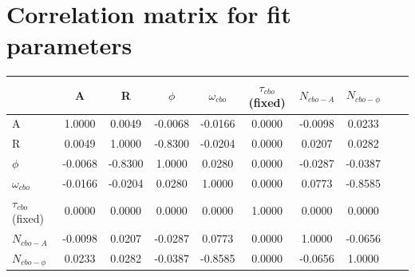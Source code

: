 \section{Correlation matrix for fit parameters}

\begin{table}[H]
\setlength\tabcolsep{0pt}
\begin{tabular*}{\linewidth}{@{\extracolsep{\fill}}
                                l
                           *{9}{c}
                            }
    \toprule
                & A & R & $\phi$ & $\omega_{cbo}$ & $\tau_{cbo}$ (fixed) & $N_{cbo-A}$ & $N_{cbo-\phi}$ \\
    \midrule
	A    			 	 &  1.0000  &  0.0049  & -0.0068  & -0.0166  &  0.0000  & -0.0098  &  0.0233  \\
	R     			 	 &  0.0049  &  1.0000  & -0.8300  & -0.0204  &  0.0000  &  0.0207  &  0.0282  \\
	$\phi$   			 & -0.0068  & -0.8300  &  1.0000  &  0.0280  &  0.0000  & -0.0287  & -0.0387  \\
	$\omega_{cbo}$   	 & -0.0166  & -0.0204  &  0.0280  &  1.0000  &  0.0000  &  0.0773  & -0.8585  \\
	$\tau_{cbo}$ (fixed) &  0.0000  &  0.0000  &  0.0000  &  0.0000  &  1.0000  &  0.0000  &  0.0000  \\
	$N_{cbo-A}$   	 	 & -0.0098  &  0.0207  & -0.0287  &  0.0773  &  0.0000  &  1.0000  & -0.0656  \\
	$N_{cbo-\phi}$   	 &  0.0233  &  0.0282  & -0.0387  & -0.8585  &  0.0000  & -0.0656  &  1.0000  \\
    \bottomrule
\end{tabular*}
\end{table}



